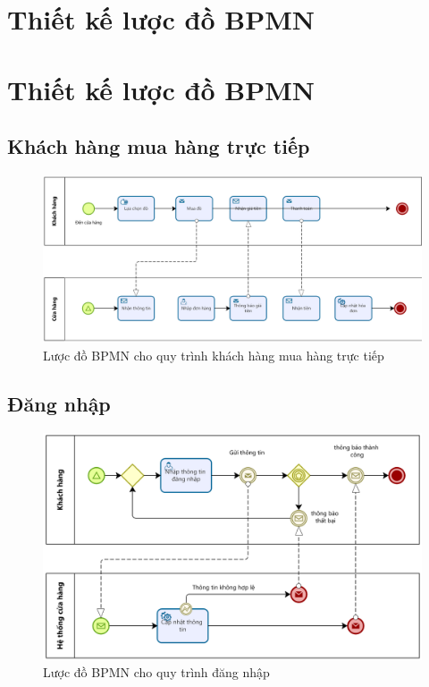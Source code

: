 \section{Thiết kế lược đồ BPMN}

\section{Thiết kế lược đồ BPMN}

\subsection{Khách hàng mua hàng trực tiếp}
\begin{figure}[!htp]
    \centering
    \includegraphics[width=14cm]{img/BPMN/Hien/Customer_buyOffline.png}
    \newline
    \caption{Lược đồ BPMN cho quy trình khách hàng mua hàng trực tiếp}
\end{figure}

\subsection{Đăng nhập}
\begin{figure}[!htp]
    \centering
    \includegraphics[width=14cm]{img/BPMN/Hien/Customer_login.png}
    \newline
    \caption{Lược đồ BPMN cho quy trình đăng nhập}
\end{figure}

